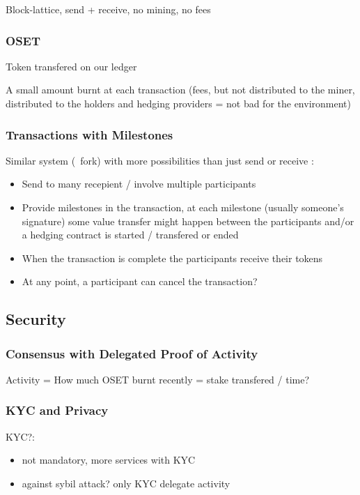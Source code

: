 \documentclass[a4paper]{article}
\begin{document}
Block-lattice, send + receive, no mining, no fees

\subsubsection{OSET}

Token transfered on our ledger

A small amount burnt at each transaction (fees, but not distributed to the miner, distributed to the holders and hedging providers = not bad for the environment)

\subsubsection{Transactions with Milestones}

Similar system (~fork) with more possibilities than just send or receive : 
\begin{itemize}
\item Send to many recepient / involve multiple participants
\item  Provide milestones in the transaction, at each milestone (usually someone's signature) some value transfer might happen between the participants and/or a hedging contract is started / transfered or ended
\item  When the transaction is complete the participants receive their tokens
\item  At any point, a participant can cancel the transaction?
\end{itemize}


\subsection{Security}

\subsubsection{Consensus with Delegated Proof of Activity}


Activity = How much OSET burnt recently = stake transfered / time?

\subsubsection{KYC and Privacy}

KYC?:
\begin{itemize}
\item not mandatory, more services with KYC
\item against sybil attack? only KYC delegate activity
\end{itemize}
\end{document}
